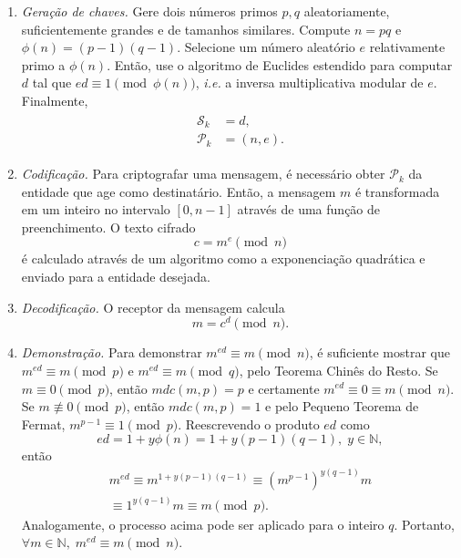 \documentclass{ufsctex/ufsctex}
\newcommand{\pk}{\mathcal{P}_{k}}
\newcommand{\sk}{\mathcal{S}_{k}}
\begin{document}
\begin{enumerate}

  \item[] \emph{Geração de chaves.} Gere dois números primos $p, q$
      aleatoriamente, suficientemente grandes e de tamanhos similares. Compute
        $n = p q$ e $\phi(n) = (p - 1) (q - 1)$. Selecione um número aleatório
        $e$ relativamente primo a $\phi(n)$. Então, use o algoritmo de Euclides
        estendido para computar $d$ tal que $ed \equiv 1 \pmod{\phi(n)}$,
        \emph{i.e.} a inversa multiplicativa modular de $e$. Finalmente,
        \begin{align}
          \begin{split}
            \sk{} &= d, \\
            \pk{} &= (n, e).
          \end{split}
        \end{align}

  \item[] \emph{Codificação.} Para criptografar uma mensagem, é necessário
      obter $\pk{}$ da entidade que age como destinatário. Então, a mensagem
        $m$ é transformada em um inteiro no intervalo $[0, n - 1]$ através de
        uma função de preenchimento. O texto cifrado
        \begin{equation}
          c = m^{e} \pmod{n}
        \end{equation}
        é calculado através de um algoritmo como a exponenciação quadrática e
        enviado para a entidade desejada.

  \item[] \emph{Decodificação.} O receptor da mensagem calcula
      \begin{equation}
        m = c^{d} \pmod{n}.
      \end{equation}

  \item[] \emph{Demonstração.} Para demonstrar $m^{ed} \equiv m \pmod{n}$, é
      suficiente mostrar que $m^{ed} \equiv m \pmod{p}$ e $m^{ed} \equiv m
        \pmod{q}$, pelo Teorema Chinês do Resto. Se $m \equiv 0 \pmod{p}$,
        então $mdc(m, p) = p$ e certamente $m^{ed} \equiv 0 \equiv m \pmod{n}$.
        Se $m \not\equiv 0 \pmod{p}$, então $mdc(m, p) = 1$ e pelo Pequeno
        Teorema de Fermat, $m^{p - 1} \equiv 1 \pmod{p}$. Reescrevendo o
        produto $ed$ como
        \begin{equation}
          ed = 1 + y\phi(n) = 1 + y(p - 1)(q - 1), \; y \in \mathbb{N},
        \end{equation}
        então
        \begin{multline}
          m^{ed} \equiv m^{1 + y(p - 1)(q - 1)}
            \equiv {(m^{p - 1})}^{y(q - 1)}m \\
            \equiv 1^{y(q - 1)}m \equiv m \pmod{p}.
        \end{multline}
        Analogamente, o processo acima pode ser aplicado para o inteiro $q$.
        Portanto, $\forall m \in \mathbb{N}, \; m^{ed} \equiv m \pmod{n}$.

\end{enumerate}
\end{document}
